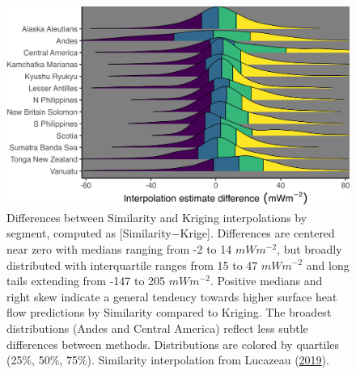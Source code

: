 \begin{figure}[htbp]

{\centering \includegraphics[width=1\linewidth,]{assets/figs/chpt3/interpDiffSummary} 

}

\caption[Differences between Similarity and Kriging interpolations]{Differences between Similarity and Kriging interpolations by segment, computed as {[}Similarity\(-\)Krige{]}. Differences are centered near zero with medians ranging from -2 to 14 \(mWm^{-2}\), but broadly distributed with interquartile ranges from 15 to 47 \(mWm^{-2}\) and long tails extending from -147 to 205 \(mWm^{-2}\). Positive medians and right skew indicate a general tendency towards higher surface heat flow predictions by Similarity compared to Kriging. The broadest distributions (Andes and Central America) reflect less subtle differences between methods. Distributions are colored by quartiles (25\%, 50\%, 75\%). Similarity interpolation from Lucazeau (\protect\hyperlink{ref-lucazeau2019}{2019}).}\label{fig:diffSummaryPlot}
\end{figure}



